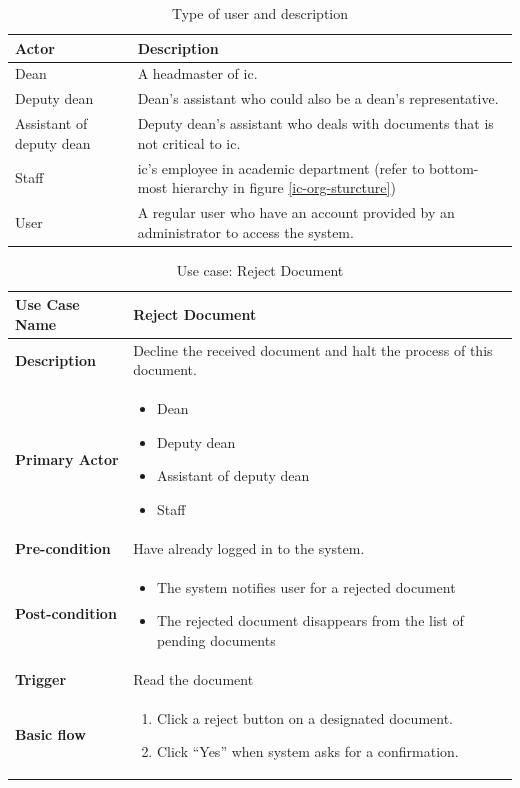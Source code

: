 \begin{table}
	\centering
	\caption{Type of user and description}
	\label{tbl:actor-description}
	\begin{tabular}{|l|L{7.5cm}|}
		\hline
		Actor & Description \\
		\hline
		Dean & A headmaster of \gls{ic}. \\
		Deputy dean & Dean's assistant who could also be a dean's representative. \\
		Assistant of deputy dean & Deputy dean's assistant who deals with documents that is not critical to \gls{ic}. \\
		Staff & \gls{ic}'s employee in academic department (refer to bottom-most hierarchy in figure \ref{ic-org-sturcture}) \\
		User & A regular user who have an account provided by an administrator to access the system. \\
		\hline
	\end{tabular}
\end{table}

\newcommand{\alreadylogin}{Have already logged in to the system}
\newcommand{\allICPersonel}{
	\begin{itemize}
		\item Dean
		\item Deputy dean
		\item Assistant of deputy dean
		\item Staff
	\end{itemize}
}

\begin{table}
	\centering
	\caption{Use case: Reject Document}
	\label{tbl-usecase:reject-document}
	
	\begin{tabular}{|l|L{9cm}|}
		\hline
		\textbf{Use Case Name} & Reject Document \\
		\hline
		
		\textbf{Description} & Decline the received document and halt the process of this document. \\
		\textbf{Primary Actor} & \allICPersonel \\
		\textbf{Pre-condition} & \alreadylogin. \\
		\textbf{Post-condition} & 
		\begin{itemize}
			\item The system notifies user for a rejected document
			\item The rejected document disappears from the list of pending documents
		\end{itemize} \\
		\textbf{Trigger} & Read the document \\
		\textbf{Basic flow} & 
		\begin{enumerate}
			\item Click a reject button on a designated document.
			\item Click \enquote{Yes} when system asks for a confirmation.
		\end{enumerate} \\
		\hline
	\end{tabular}
\end{table}

